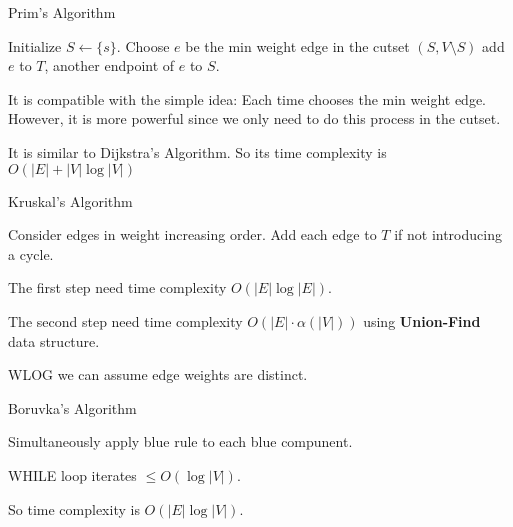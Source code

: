 \begin{algorithm}
    \caption{Prim's Algorithm}
    \label{alg:Prim}
    \begin{algorithmic}[1]
    \STATE Initialize  $ S\leftarrow \{s\} $.
        \STATE Choose   $ e  $ be the min weight edge in the cutset $ (S,V\setminus S) $  
        \STATE add  $ e $ to  $ T $, another endpoint of  $ e $ to  $ S $. 
    \ENDWHILE
    \end{algorithmic}
\end{algorithm}

\begin{remark}
    It is compatible with the simple idea: Each time chooses the min weight edge. However, it is more powerful since we only need to do this process in the cutset.

    It is similar to Dijkstra's Algorithm. So its time complexity is  $ O(|E|+|V|\log |V|) $ 
\end{remark}



\begin{algorithm}
    \caption{Kruskal's Algorithm}
    \label{alg:Kruskal}
    \begin{algorithmic}[1]
        \STATE Consider edges in weight increasing order.
        \STATE Add each edge to  $ T $ if not introducing a cycle. 
    \end{algorithmic}
\end{algorithm}
\begin{remark}
    The first step need time complexity  $ O(|E|\log |E|) $.

    The second step need time complexity  $ O(|E|\cdot \alpha(|V|)) $ using \textbf{Union-Find} data structure. 
\end{remark}

WLOG we can assume edge weights are distinct.
\begin{algorithm}
    \caption{Boruvka's Algorithm}
    \label{alg:Boruvka}
    \begin{algorithmic}[1]
            \STATE Simultaneously apply blue rule to each blue compunent.
        \ENDWHILE
    \end{algorithmic}
\end{algorithm}

\begin{claim}
    WHILE loop iterates  $  \leq O(\log|V|) $.
    
    So time complexity is  $ O(|E|\log|V|) $. 
\end{claim}

